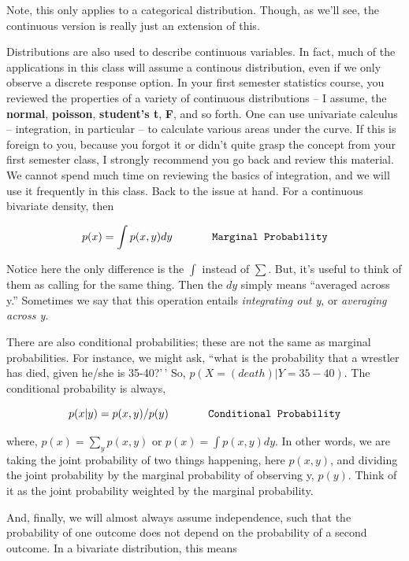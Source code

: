 \documentclass[
]{book}
\begin{document}
Note, this only applies to a categorical distribution. Though, as we'll see, the continuous version is really just an extension of this.

Distributions are also used to describe continuous variables. In fact, much of the applications in this class will assume a continous distribution, even if we only observe a discrete response option. In your first semester statistics course, you reviewed the properties of a variety of continuous distributions -- I assume, the \textbf{normal}, \textbf{poisson}, \textbf{student's t}, \textbf{F}, and so forth. One can use univariate calculus -- integration, in particular -- to calculate various areas under the curve. If this is foreign to you, because you forgot it or didn't quite grasp the concept from your first semester class, I strongly recommend you go back and review this material. We cannot spend much time on reviewing the basics of integration, and we will use it frequently in this class. Back to the issue at hand. For a continuous bivariate density, then

\[p(x)=\int p(x, y) dy \hspace{0.5in}  \texttt{Marginal Probability}\]

Notice here the only difference is the \(\int\) instead of \(\sum\). But, it's useful to think of them as calling for the same thing. Then the \(dy\) simply means ``averaged across y.'' Sometimes we say that this operation entails \emph{integrating out y}, or \emph{averaging across y.}

There are also conditional probabilities; these are not the same as marginal probabilities. For instance, we might ask, ``what is the probability that a wrestler has died, given he/she is 35-40?'\,' So, \(p(X=(death) | Y=35-40)\). The conditional probability is always,

\[p(x|y)=p(x,y)/p(y)\hspace{0.5in}  \texttt{Conditional Probability}\]

where, \(p(x)=\sum_y p(x, y)\) or \(p(x)=\int p(x, y) dy\). In other words, we are taking the joint probability of two things happening, here \(p(x,y)\), and dividing the joint probability by the marginal probability of observing y, \(p(y)\). Think of it as the joint probability weighted by the marginal probability.

And, finally, we will almost always assume independence, such that the probability of one outcome does not depend on the probability of a second outcome. In a bivariate distribution, this means
\end{document}
